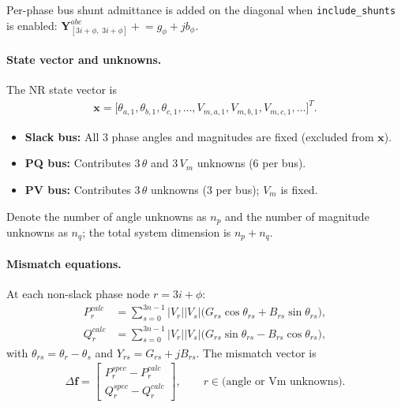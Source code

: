 Per-phase bus shunt admittance is added on the diagonal when
\texttt{include\_shunts} is enabled:
$\mathbf{Y}^{abc}_{[3i{+}\phi,\;3i{+}\phi]} \mathrel{+}= g_\phi + jb_\phi$.

\paragraph{State vector and unknowns.}
The NR state vector is
\begin{align}
  \mathbf{x} = \bigl[
    \theta_{a,1},\theta_{b,1},\theta_{c,1},\ldots,
    V_{m,a,1},V_{m,b,1},V_{m,c,1},\ldots
  \bigr]^T.
\end{align}
\begin{itemize}
  \item \textbf{Slack bus:} All 3 phase angles and magnitudes are fixed
        (excluded from $\mathbf{x}$).
  \item \textbf{PQ bus:} Contributes $3\,\theta$ and $3\,V_m$ unknowns (6 per bus).
  \item \textbf{PV bus:} Contributes $3\,\theta$ unknowns (3 per bus); $V_m$ is fixed.
\end{itemize}
Denote the number of angle unknowns as $n_p$ and the number of magnitude
unknowns as $n_q$; the total system dimension is $n_p + n_q$.

\paragraph{Mismatch equations.}
At each non-slack phase node $r = 3i + \phi$:
\begin{align}
  P_r^{calc} &= \sum_{s=0}^{3n-1} |V_r||V_s|
    \bigl(G_{rs}\cos\theta_{rs} + B_{rs}\sin\theta_{rs}\bigr), \\
  Q_r^{calc} &= \sum_{s=0}^{3n-1} |V_r||V_s|
    \bigl(G_{rs}\sin\theta_{rs} - B_{rs}\cos\theta_{rs}\bigr),
\end{align}
with $\theta_{rs} = \theta_r - \theta_s$ and
$Y_{rs} = G_{rs} + jB_{rs}$.  The mismatch vector is
\begin{align}
  \Delta \mathbf{f} =
  \begin{bmatrix}
    P_r^{spec} - P_r^{calc} \\
    Q_r^{spec} - Q_r^{calc}
  \end{bmatrix},
  \qquad r \in \text{(angle or Vm unknowns)}.
\end{align}

